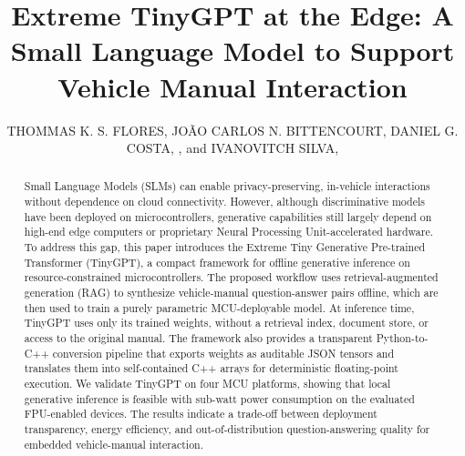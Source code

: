\documentclass{ieeeaccess}
\begin{document}

\title{Extreme TinyGPT at the Edge: A Small Language Model to Support Vehicle Manual Interaction}
\author{\uppercase{Thommas K. S. Flores}, 
\uppercase{João Carlos N. Bittencourt}, 
\uppercase{Daniel G. Costa}, ,
and \uppercase{Ivanovitch Silva}, }

\address[1]{Federal University of Rio Grande do Norte/PPgEEC, Av. Senador Salgado Filho, 3000, Lagoa Nova, Natal-Rio Grande do Norte, 59078–970, Brazil, thommas.flores.101@ufrn.edu.br and ivanovitch.silva@ufrn.br}

\address[2]{CETEC, Federal University of Recôncavo da Bahia, Cruz das Almas 44380-000, Brazil; joaocarlos@ufrb.edu.br}

\address[3]{SYSTEC-ARISE, Faculty of Engineering, University of Porto, Porto, 4200-465, Portugal, danielgcosta@fe.up.pt}






\begin{abstract}
Small Language Models (SLMs) can enable privacy-preserving, in-vehicle interactions without dependence on cloud connectivity. However, although discriminative models have been deployed on microcontrollers, generative capabilities still largely depend on high-end edge computers or proprietary Neural Processing Unit-accelerated hardware. To address this gap, this paper introduces the Extreme Tiny Generative Pre-trained Transformer (TinyGPT), a compact framework for offline generative inference on resource-constrained microcontrollers. The proposed workflow uses retrieval-augmented generation (RAG) to synthesize vehicle-manual question-answer pairs offline, which are then used to train a purely parametric MCU-deployable model. At inference time, TinyGPT uses only its trained weights, without a retrieval index, document store, or access to the original manual. The framework also provides a transparent Python-to-C++ conversion pipeline that exports weights as auditable JSON tensors and translates them into self-contained C++ arrays for deterministic floating-point execution. We validate TinyGPT on four MCU platforms, showing that local generative inference is feasible with sub-watt power consumption on the evaluated FPU-enabled devices. The results indicate a trade-off between deployment transparency, energy efficiency, and out-of-distribution question-answering quality for embedded vehicle-manual interaction.
\end{abstract}
\end{document}
